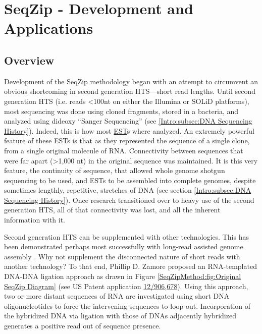 \chapter{SeqZip - Development and Applications} 
\label{SeqZipMethod} 
\section{Overview}
  \label{SeqZipMethod:sec:SeqZip Overview}

  Development of the SeqZip methodology began with an attempt to circumvent an obvious shortcoming in second generation HTS---short read lengths. Until second generation HTS (i.e. reads <100nt on either the Illumina or SOLiD platforms), most sequencing was done using cloned fragments, stored in a bacteria, and analyzed using dideoxy ``Sanger Sequencing'' (see \ref{Intro:subsec:DNA Sequencing History}). Indeed, this is how most \hyperref[hd:abrevs]{EST}s where analyzed. An extremely powerful feature of these ESTs is that as they represented the sequence of a single clone, from a single original molecule of RNA. Connectivity between sequences that were far apart (>1,000 nt) in the original sequence was maintained. It is this very feature, the continuity of sequence, that allowed whole genome shotgun sequencing to be used, and ESTs to be assembled into complete genomes, despite sometimes lengthly, repetitive, stretches of DNA (see section \ref{Intro:subsec:DNA Sequencing History}). Once research transitioned over to heavy use of the second generation HTS, all of that connectivity was lost, and all the inherent information with it.

  Second generation HTS can be supplemented with other technologies. This has been demonstrated perhaps most successfully with long-read assisted genome assembly \citep{Koren2012a}. Why not supplement the disconnected nature of short reads with another technology? To that end, Phillip D. Zamore proposed an RNA-templated DNA-DNA ligation approach as drawn in Figure \ref{SeqZipMethod:fig:Original SeqZip Diagram} (see US Patent application \href{http://1.usa.gov/PTG9BB}{12/906,678}). Using this approach, two or more distant sequences of RNA are investigated using short DNA oligonucleotides to force the intervening sequences to loop out. Incorporation of the hybridized DNA via ligation with those of DNAs adjacently hybridized generates a positive read out of sequence presence.

